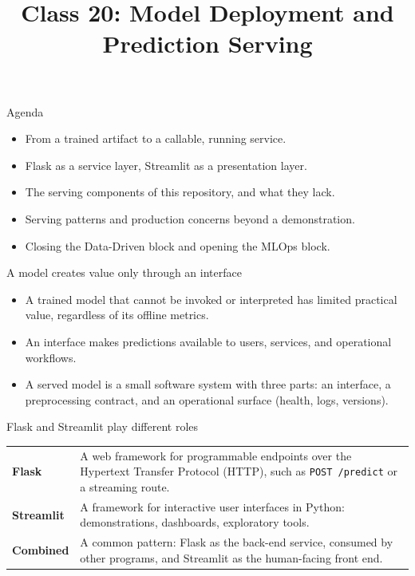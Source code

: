 
\usepackage{amssymb}

\title{Class 20: Model Deployment and Prediction Serving}
\author{\coursename}
\date{}



\frame{\titlepage \coursefooter}

\begin{frame}{Agenda}
\begin{itemize}
\item From a trained artifact to a callable, running service.
\item Flask as a service layer, Streamlit as a presentation layer.
\item The serving components of this repository, and what they lack.
\item Serving patterns and production concerns beyond a demonstration.
\item Closing the Data-Driven block and opening the MLOps block.
\end{itemize}
\coursefooter
\end{frame}

\begin{frame}{A model creates value only through an interface}
\begin{itemize}
\item A trained model that cannot be invoked or interpreted has limited practical value, regardless of its offline metrics.
\item An interface makes predictions available to users, services, and operational workflows.
\item A served model is a small software system with three parts: an interface, a preprocessing contract, and an operational surface (health, logs, versions).
\end{itemize}
\coursefooter
\end{frame}

\begin{frame}{Flask and Streamlit play different roles}
\begin{tabularx}{\textwidth}{>{\bfseries}l X}
Flask & A web framework for programmable endpoints over the Hypertext Transfer Protocol (HTTP), such as \texttt{POST /predict} or a streaming route. \\
\addlinespace[0.3em]
Streamlit & A framework for interactive user interfaces in Python: demonstrations, dashboards, exploratory tools. \\
\addlinespace[0.3em]
Combined & A common pattern: Flask as the back-end service, consumed by other programs, and Streamlit as the human-facing front end. \\
\bottomrule
\end{tabularx}
\coursefooter
\end{frame}

